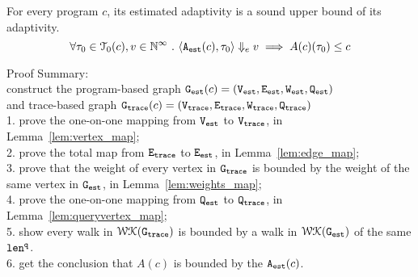   
\begin{thm}
	For every program $c$, 
	its estimated adaptivity is a sound upper bound of its adaptivity.
	 \[
	 \forall \mathtt{\tau}_0 \in \mathcal{T}_{0}(c), v \in \mathbb{N}^{\infty} ~.~ 
  \langle {\ensuremath{\mathtt{A_{est}}}}(c), \mathtt{\tau}_0 \rangle \Downarrow_e v \implies A(c)(\mathtt{\tau}_0) \leq c
  \] 
  \end{thm}
Proof Summary:
\\
construct the
program-based graph $\mathtt{{G_{est}}}({c}) = (\mathtt{{V_{est}}}, \mathtt{{E_{est}}}, \mathtt{{W_{est}}}, \mathtt{{Q_{est}}})$
\\
and trace-based graph $\mathtt{{G_{trace}}}({c}) = (\mathtt{{V_{trace}}}, \mathtt{{E_{trace}}}, \mathtt{{W_{trace}}}, \mathtt{{Q_{trace}}})$ 
\\
1. prove the one-on-one mapping from $\mathtt{{V_{est}}}$ to $\mathtt{{V_{trace}}}$, in Lemma~\ref{lem:vertex_map};
\\
2. prove the total map from $\mathtt{{E_{trace}}}$ to $\mathtt{{E_{est}}}$, in Lemma~\ref{lem:edge_map};
\\
3. prove that the weight of every vertex in $\mathtt{{G_{trace}}}$ is bounded by the weight of the same vertex in $\mathtt{{G_{est}}}$, in 
Lemma~\ref{lem:weights_map};
\\
4. prove the one-on-one mapping from $\mathtt{{Q_{est}}}$ to $\mathtt{{Q_{trace}}}$, in Lemma~\ref{lem:queryvertex_map};
\\
5. show every walk in $\mathcal{WK}(\mathtt{{G_{trace}}})$ is bounded by a walk in $\mathcal{WK}(\mathtt{{G_{est}}})$ of the same $\mathtt{len}^{\tt q}$.
\\
6. get the conclusion that $A(c)$ is bounded by 
the ${\mathtt{A_{est}}}(c)$.
%
